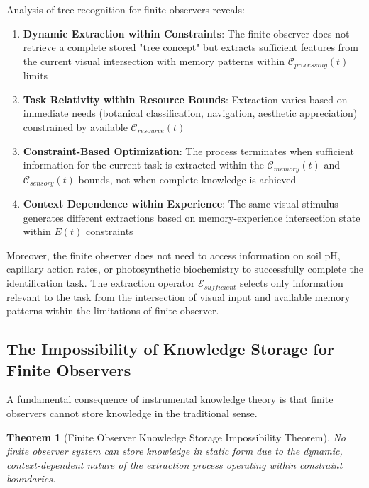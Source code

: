 \documentclass{article}
\newtheorem{theorem}{Theorem}[section]
\begin{document}
Analysis of tree recognition for finite observers reveals:
\begin{enumerate}
\item \textbf{Dynamic Extraction within Constraints}: The finite observer does not retrieve a complete stored "tree concept" but extracts sufficient features from the current visual intersection with memory patterns within $\mathcal{C}_{processing}(t)$ limits
\item \textbf{Task Relativity within Resource Bounds}: Extraction varies based on immediate needs (botanical classification, navigation, aesthetic appreciation) constrained by available $\mathcal{C}_{resource}(t)$
\item \textbf{Constraint-Based Optimization}: The process terminates when sufficient information for the current task is extracted within the $\mathcal{C}_{memory}(t)$ and $\mathcal{C}_{sensory}(t)$ bounds, not when complete knowledge is achieved
\item \textbf{Context Dependence within Experience}: The same visual stimulus generates different extractions based on memory-experience intersection state within $E(t)$ constraints
\end{enumerate}

Moreover, the finite observer does not need to access information on soil pH, capillary action rates, or photosynthetic biochemistry to successfully complete the identification task. The extraction operator $\mathcal{E}_{sufficient}$ selects only information relevant to the task from the intersection of visual input and available memory patterns within the limitations of finite observer.

\subsection{The Impossibility of Knowledge Storage for Finite Observers}

A fundamental consequence of instrumental knowledge theory is that finite observers cannot store knowledge in the traditional sense.

\begin{theorem}[Finite Observer Knowledge Storage Impossibility Theorem]
No finite observer system can store knowledge in static form due to the dynamic, context-dependent nature of the extraction process operating within constraint boundaries.
\end{theorem}
\end{document}
